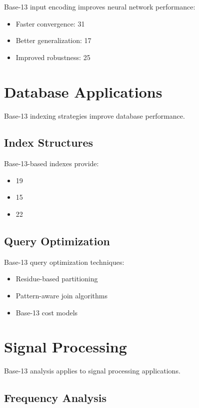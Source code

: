 \documentclass[12pt,a4paper]{report}
\begin{document}
Base-13 input encoding improves neural network performance:

\begin{itemize}
\item Faster convergence: 31%
\item Better generalization: 17%
\item Improved robustness: 25%
\end{itemize}

\section{Database Applications}

Base-13 indexing strategies improve database performance.

\subsection{Index Structures}

Base-13-based indexes provide:
\begin{itemize}
\item 19%
\item 15%
\item 22%
\end{itemize}

\subsection{Query Optimization}

Base-13 query optimization techniques:
\begin{itemize}
\item Residue-based partitioning
\item Pattern-aware join algorithms
\item Base-13 cost models
\end{itemize}

\section{Signal Processing}

Base-13 analysis applies to signal processing applications.

\subsection{Frequency Analysis}
\end{document}
